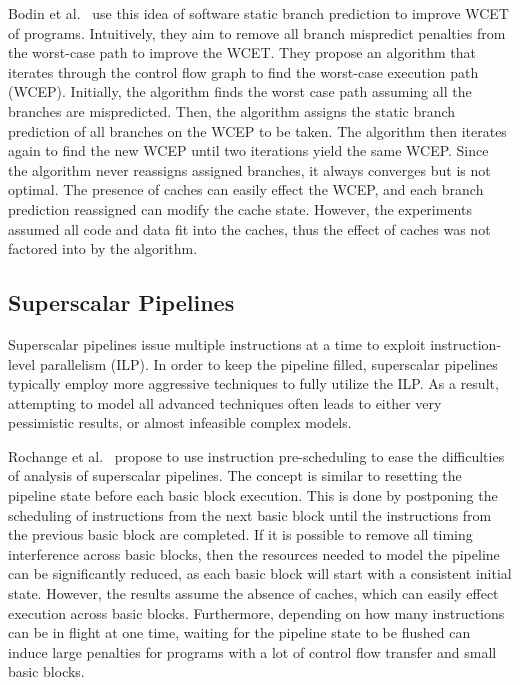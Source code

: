 Bodin et al.~\cite{Bodin2005staticbranch} use this idea of software static branch prediction to improve WCET of programs.
Intuitively, they aim to remove all branch mispredict penalties from the worst-case path to improve the WCET. 
They propose an algorithm that iterates through the control flow graph to find the worst-case execution path (WCEP). 
Initially, the algorithm finds the worst case path assuming all the branches are mispredicted. 
Then, the algorithm assigns the static branch prediction of all branches on the WCEP to be taken.
The algorithm then iterates again to find the new WCEP until two iterations yield the same WCEP.
Since the algorithm never reassigns assigned branches, it always converges but is not optimal.
The presence of caches can easily effect the WCEP, and each branch prediction reassigned can modify the cache state.
However, the experiments assumed all code and data fit into the caches, thus the effect of caches was not factored into by the algorithm.

\subsection{Superscalar Pipelines}
\label{sec:RTSuperscale}
Superscalar pipelines issue multiple instructions at a time to exploit instruction-level parallelism (ILP). 
In order to keep the pipeline filled, superscalar pipelines typically employ more aggressive techniques to fully utilize the ILP. 
As a result, attempting to model all advanced techniques often leads to either very pessimistic results, or almost infeasible complex models.

Rochange et al.~\cite{Rochange2005superscalar} propose to use instruction pre-scheduling to ease the difficulties of analysis of superscalar pipelines.  
The concept is similar to resetting the pipeline state before each basic block execution. 
This is done by postponing the scheduling of instructions from the next basic block until the instructions from the previous basic block are completed.
If it is possible to remove all timing interference across basic blocks, then the resources needed to model the pipeline can be significantly reduced, as each basic block will start with a consistent initial state.
However, the results assume the absence of caches, which can easily effect execution across basic blocks.  
Furthermore, depending on how many instructions can be in flight at one time, waiting for the pipeline state to be flushed can induce large penalties for programs with a lot of control flow transfer and small basic blocks. 

